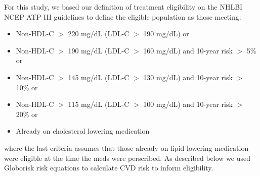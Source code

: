 \documentclass[12pt]{article}
\begin{document}
\begin{appendix}
    For this study, we based our definition of treatment eligibility on the NHLBI NCEP ATP III guidelines to define the eligible population as those meeting:
    \begin{itemize}
        \item Non-HDL-C $>$ 220 mg/dL (LDL-C $>$ 190 mg/dL) or
        \item Non-HDL-C $>$ 190 mg/dL (LDL-C $>$ 160 mg/dL) and 10-year risk $>$ 5\% or
        \item Non-HDL-C $>$ 145 mg/dL (LDL-C $>$ 130 mg/dL) and 10-year risk $>$ 10\% or
        \item Non-HDL-C $>$ 115 mg/dL (LDL-C $>$ 100 mg/dL) and 10-year risk $>$ 20\% or
        \item Already on cholesterol lowering medication
    \end{itemize}
    where the last criteria assumes that those already on lipid-lowering medication were eligible at the time the meds were perscribed. As described below we used Globorisk risk equations to calculate CVD risk to inform eligibility.


\end{appendix}
\end{document}
